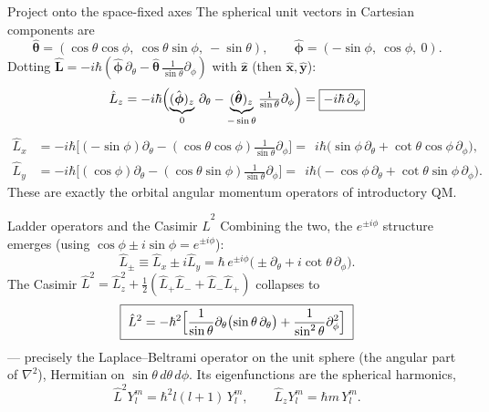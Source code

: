 \documentclass[aspectratio=169,10pt]{beamer}
\begin{document}
\begin{frame}{Project onto the space-fixed axes}
The spherical unit vectors in Cartesian components are
\begin{equation*}
\hat{\boldsymbol\theta}=(\cos\theta\cos\phi,\ \cos\theta\sin\phi,\ -\sin\theta),\qquad
\hat{\boldsymbol\phi}=(-\sin\phi,\ \cos\phi,\ 0).
\end{equation*}
Dotting $\hat{\mathbf L}=-i\hbar(\hat{\boldsymbol\phi}\,\partial_\theta-\hat{\boldsymbol\theta}\,\tfrac{1}{\sin\theta}\partial_\phi)$ with $\hat{\mathbf z}$ (then $\hat{\mathbf x},\hat{\mathbf y}$):
\begin{equation*}
\hat L_z=-i\hbar\Bigl(\underbrace{(\hat{\boldsymbol\phi})_z}_{0}\,\partial_\theta-\underbrace{(\hat{\boldsymbol\theta})_z}_{-\sin\theta}\tfrac{1}{\sin\theta}\partial_\phi\Bigr)=\boxed{-i\hbar\,\partial_\phi}
\end{equation*}
\begin{align*}
\hat L_x&=-i\hbar\bigl[(-\sin\phi)\partial_\theta-(\cos\theta\cos\phi)\tfrac{1}{\sin\theta}\partial_\phi\bigr]=\ \ i\hbar\bigl(\sin\phi\,\partial_\theta+\cot\theta\cos\phi\,\partial_\phi\bigr),\\
\hat L_y&=-i\hbar\bigl[(\cos\phi)\partial_\theta-(\cos\theta\sin\phi)\tfrac{1}{\sin\theta}\partial_\phi\bigr]=\ \ i\hbar\bigl(-\cos\phi\,\partial_\theta+\cot\theta\sin\phi\,\partial_\phi\bigr).
\end{align*}
\centering These are exactly the orbital angular momentum operators of introductory QM.
\end{frame}

\begin{frame}{Ladder operators and the Casimir $\hat L^2$}
Combining the two, the $e^{\pm i\phi}$ structure emerges (using $\cos\phi\pm i\sin\phi=e^{\pm i\phi}$):
\begin{equation*}
\hat L_\pm\equiv\hat L_x\pm i\hat L_y=\hbar\,e^{\pm i\phi}\bigl(\pm\partial_\theta+i\cot\theta\,\partial_\phi\bigr).
\end{equation*}
The Casimir $\hat L^2=\hat L_z^2+\tfrac12(\hat L_+\hat L_-+\hat L_-\hat L_+)$ collapses to
\begin{equation*}
\boxed{\;\hat L^2=-\hbar^2\Bigl[\frac{1}{\sin\theta}\partial_\theta\bigl(\sin\theta\,\partial_\theta\bigr)+\frac{1}{\sin^2\theta}\partial_\phi^2\Bigr]\;}
\end{equation*}
--- precisely the \alert{Laplace--Beltrami operator on the unit sphere} (the angular part of $\nabla^2$), Hermitian on $\sin\theta\,d\theta\,d\phi$. Its eigenfunctions are the spherical harmonics,
\begin{equation*}
\hat L^2 Y_l^m=\hbar^2 l(l+1)\,Y_l^m,\qquad \hat L_z Y_l^m=\hbar m\,Y_l^m .
\end{equation*}
\end{frame}
\end{document}
